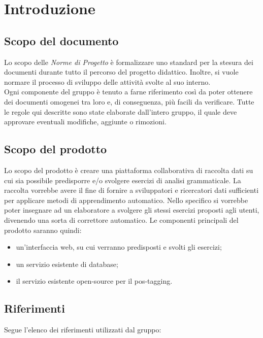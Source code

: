 \documentclass[11pt,a4paper]{article}
\begin{document}
	\newpage	

	\renewcommand  \contentsname {\Large Indice} 
	
	\tableofcontents
	\newpage
	
	\section{Introduzione}
	\subsection{Scopo del documento}
	Lo scopo delle \textit{Norme di Progetto} è formalizzare uno standard per la stesura dei documenti durante tutto il percorso del progetto didattico. Inoltre, si vuole normare il processo di sviluppo delle attività svolte al suo interno. 
	\\Ogni componente del gruppo è tenuto a farne riferimento così da poter ottenere dei documenti omogenei tra loro e, di conseguenza, più facili da verificare. 
	Tutte le regole qui descritte sono state elaborate dall'intero gruppo, il quale deve approvare eventuali modifiche, aggiunte o rimozioni.
	\subsection{Scopo del prodotto}
	Lo scopo del prodotto è creare una piattaforma collaborativa di raccolta dati su cui sia possibile predisporre e/o svolgere esercizi di analisi grammaticale. La raccolta vorrebbe avere il fine di fornire a sviluppatori e ricercatori dati sufficienti per applicare metodi di apprendimento automatico. Nello specifico si vorrebbe poter insegnare ad un elaboratore a svolgere gli stessi esercizi proposti agli utenti, divenendo una sorta di correttore automatico.  
	Le componenti principali del prodotto saranno quindi:
	\begin{itemize}
		\item un'interfaccia web, su cui verranno predisposti e svolti gli esercizi;
		\item un servizio esistente di database;
		\item il servizio esistente open-source per il pos-tagging.
	\end{itemize}
	
	\subsection{Riferimenti}
	Segue l'elenco dei riferimenti utilizzati dal gruppo:
\end{document}
